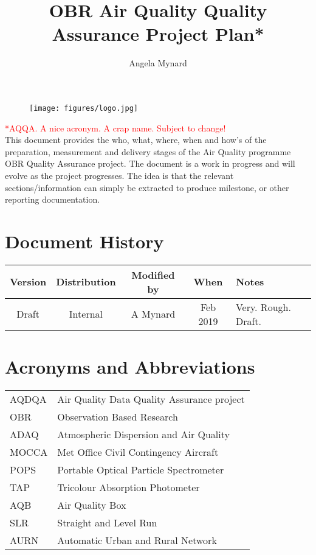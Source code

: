 \documentclass[11pt]{article} %
\title{OBR Air Quality Quality Assurance Project Plan*}
\author{Angela Mynard}
\begin{document}
\maketitle

\begin{figure}[!h]
    \centering
    \texttt{[image: figures/logo.jpg]}
\end{figure}

\textcolor{red}{*AQQA. A nice acronym. A crap name. Subject to change!}\\
This document provides the who, what, where, when and how's of the preparation, measurement and delivery stages of the Air Quality programme OBR Quality Assurance project. The document is a work in progress and will evolve as the project progresses. The idea is that the relevant sections/information can simply be extracted to produce milestone, or other reporting documentation.\\

\newpage
\section{Document History}

\begin{longtable}{|c|c|c|c|p{6cm}|}
\hline
\textbf{Version} & \textbf{Distribution} & \textbf{Modified by} & \textbf{When} & \textbf{Notes} \\
\hline
Draft & Internal & A Mynard & Feb 2019 & Very. Rough. Draft. \\
\hline
\end{longtable}


\newpage
\tableofcontents

\newpage
\section{Acronyms and Abbreviations}
\begin{tabular}{ll}
AQDQA & Air Quality Data Quality Assurance project \\
OBR & Observation Based Research \\
ADAQ & Atmospheric Dispersion and Air Quality \\
MOCCA & Met Office Civil Contingency Aircraft \\
POPS & Portable Optical Particle Spectrometer \\
TAP & Tricolour Absorption Photometer \\
AQB & Air Quality Box \\
SLR & Straight and Level Run \\
AURN & Automatic Urban and Rural Network \\
\end{tabular}
\newpage
\end{document}
